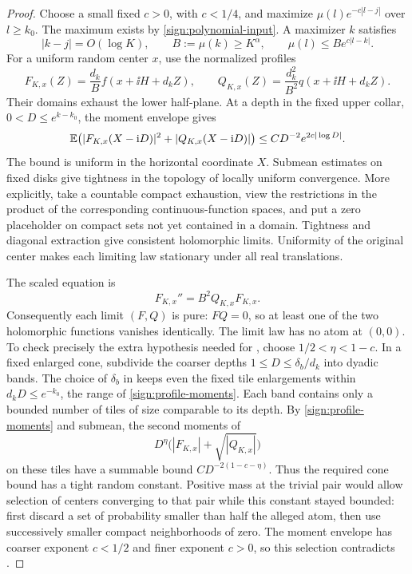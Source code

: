 \begin{proof}
Choose a small fixed \(c>0\), with \(c<1/4\), and maximize
\(\mu(l)e^{-c|l-j|}\) over \(l\ge k_0\).  The maximum exists by
\eqref{sign:polynomial-input}.  A maximizer \(k\) satisfies
\[
 |k-j|=O(\log K),\qquad B:=\mu(k)\ge K^\alpha,
 \qquad \mu(l)\le B e^{c|l-k|}.
\]
For a uniform random center \(x\), use the normalized profiles
\begin{equation}\label{sign:profile-normalization}
 F_{K,x}(Z)=\frac{d_k}{B}f(x+\ii H+d_k Z),\qquad
 Q_{K,x}(Z)=\frac{d_k^2}{B^2}q(x+\ii H+d_k Z).
\end{equation}
Their domains exhaust the lower half-plane. At a depth in the fixed
upper collar, \(0<D\le e^{k-k_0}\), the moment envelope gives
\begin{equation}\label{sign:profile-moments}
 \mathbb E\bigl(|F_{K,x}(X-\mathrm i D)|^2+|Q_{K,x}(X-\mathrm i D)|\bigr)
 \le C D^{-2}e^{2c|\log D|}.
\end{equation}
The bound is uniform in the horizontal coordinate \(X\).  Submean
estimates on fixed disks give tightness in the topology of locally
uniform convergence.  More explicitly, take a countable compact
exhaustion, view the restrictions in the product of the corresponding
continuous-function spaces, and put a zero placeholder on compact sets
not yet contained in a domain.  Tightness and diagonal extraction give
consistent holomorphic limits.  Uniformity of the original center makes
each limiting law stationary under all real translations.

The scaled equation is
\[
 F_{K,x}''=B^2Q_{K,x}F_{K,x}.
\]
Consequently each limit \((F,Q)\) is pure: \(FQ=0\), so at least one of
the two holomorphic functions vanishes identically.  The limit law has no
atom at \((0,0)\).  To check precisely the extra hypothesis needed for
, choose
\(1/2<\eta<1-c\). In a fixed enlarged cone, subdivide the coarser
depths \(1\le D\le\delta_b/d_k\) into dyadic bands. The choice of
\(\delta_b\) in  keeps even the fixed tile
enlargements within \(d_kD\le e^{-k_0}\), the range of
\eqref{sign:profile-moments}. Each band contains only a bounded
number of tiles of size comparable to its depth.  By
\eqref{sign:profile-moments} and submean, the second moments of
\[
 D^\eta\bigl(|F_{K,x}|+\sqrt{|Q_{K,x}|}\bigr)
\]
on these tiles have a summable bound
\(C D^{-2(1-c-\eta)}\).  Thus the required cone bound has a tight random
constant.  Positive mass at the trivial pair would allow selection of
centers converging to that pair while this constant stayed bounded:
first discard a set of probability smaller than half the alleged atom,
then use successively smaller compact neighborhoods of zero.  The
moment envelope has coarser exponent \(c<1/2\) and finer exponent
\(c>0\), so this selection contradicts
.


\end{proof}
